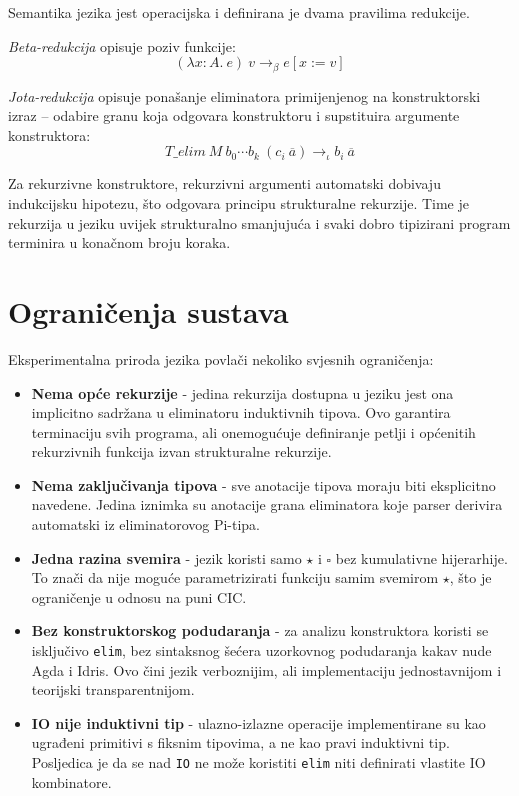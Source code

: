 \documentclass[diplomskirad,upload]{fer}
\begin{document}
Semantika jezika jest operacijska i definirana je dvama pravilima redukcije.

\emph{Beta-redukcija} opisuje poziv funkcije:
\[
    (\lambda x : A.\ e)\ v \longrightarrow_\beta e[x := v]
\]

\emph{Jota-redukcija} opisuje ponašanje eliminatora primijenjenog na
konstruktorski izraz -- odabire granu koja odgovara konstruktoru i
supstituira argumente konstruktora:
\[
    T\text{\_}elim\ M\ b_0 \cdots b_k\ (c_i\ \overline{a})
    \longrightarrow_\iota b_i\ \overline{a}
\]

Za rekurzivne konstruktore, rekurzivni argumenti automatski dobivaju
indukcijsku hipotezu, što odgovara principu strukturalne rekurzije. Time je
rekurzija u jeziku uvijek strukturalno smanjujuća i svaki dobro tipizirani
program terminira u konačnom broju koraka.

\section{Ograničenja sustava}

Eksperimentalna priroda jezika povlači nekoliko svjesnih ograničenja:

\begin{itemize}
    \item \textbf{Nema opće rekurzije} - jedina rekurzija dostupna u jeziku
    jest ona implicitno sadržana u eliminatoru induktivnih tipova. Ovo
    garantira terminaciju svih programa, ali onemogućuje definiranje petlji i
    općenitih rekurzivnih funkcija izvan strukturalne rekurzije.

    \item \textbf{Nema zaključivanja tipova} - sve anotacije tipova moraju biti
    eksplicitno navedene. Jedina iznimka su anotacije grana eliminatora koje
    parser derivira automatski iz eliminatorovog Pi-tipa.

    \item \textbf{Jedna razina svemira} - jezik koristi samo \(\star\) i
    \(\square\) bez kumulativne hijerarhije. To znači da nije moguće
    parametrizirati funkciju samim svemirom \(\star\), što je ograničenje
    u odnosu na puni CIC.

    \item \textbf{Bez konstruktorskog podudaranja} - za analizu konstruktora koristi
    se isključivo \texttt{elim}, bez sintaksnog šećera uzorkovnog podudaranja
    kakav nude Agda i Idris. Ovo čini jezik verboznijim, ali implementaciju
    jednostavnijom i teorijski transparentnijom.

    \item \textbf{IO nije induktivni tip} - ulazno-izlazne operacije
    implementirane su kao ugrađeni primitivi s fiksnim tipovima, a ne kao
        pravi induktivni tip. Posljedica je da se nad \texttt{IO} ne može
    koristiti \texttt{elim} niti definirati vlastite IO kombinatore.
\end{itemize}
\end{document}

